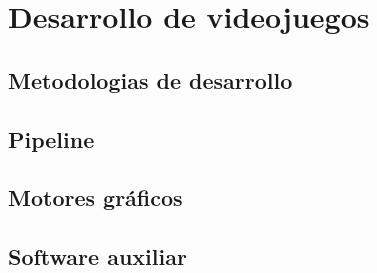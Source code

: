 \section{Desarrollo de videojuegos}
			\subsection{Metodologias de desarrollo}
			\subsection{Pipeline}
			\subsection{Motores gráficos}
			\subsection{Software auxiliar}